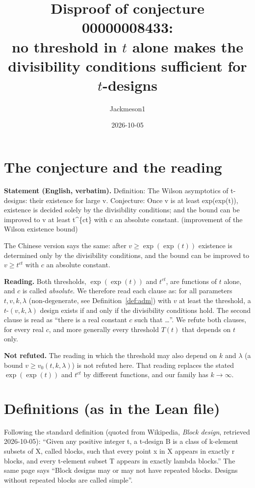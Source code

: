 \documentclass[11pt]{article}
\title{Disproof of conjecture 00000008433:\\ no threshold in $t$ alone makes the divisibility conditions sufficient for $t$-designs}
\author{Jackmeson1}
\date{2026-10-05}
\theoremstyle{definition}
\begin{document}
\maketitle

\section{The conjecture and the reading}

\textbf{Statement (English, verbatim).} Definition: The Wilson asymptotics of t-designs: their
existence for large v. Conjecture: Once v is at least exp(exp(t)), existence is decided solely by
the divisibility conditions; and the bound can be improved to v at least t\^{}\{ct\} with c an
absolute constant. (improvement of the Wilson existence bound)

The Chinese version says the same: after $v\ge \exp(\exp(t))$ existence is determined only by the
divisibility conditions, and the bound can be improved to $v\ge t^{ct}$ with $c$ an absolute
constant.

\textbf{Reading.} Both thresholds, $\exp(\exp(t))$ and $t^{ct}$, are functions of $t$ alone, and
$c$ is called \emph{absolute}. We therefore read each clause as: for all parameters
$t,v,k,\lambda$ (non-degenerate, see Definition~\ref{def:adm}) with $v$ at least the threshold, a
$t$-$(v,k,\lambda)$ design exists if and only if the divisibility conditions hold. The second clause
is read as ``there is a real constant $c$ such that \dots''. We refute both clauses, for every real
$c$, and more generally every threshold $T(t)$ that depends on $t$ only.

\textbf{Not refuted.} The reading in which the threshold may also depend on $k$ and $\lambda$
(a bound $v\ge v_0(t,k,\lambda)$) is not refuted here. That reading replaces the stated
$\exp(\exp(t))$ and $t^{ct}$ by different functions, and our family has $k\to\infty$.

\section{Definitions (as in the Lean file)}

Following the standard definition (quoted from Wikipedia, \emph{Block design}, retrieved
2026-10-05): ``Given any positive integer t, a t-design B is a class of k-element subsets of X,
called blocks, such that every point x in X appears in exactly r blocks, and every t-element subset
T appears in exactly lambda blocks.'' The same page says ``Block designs may or may not have
repeated blocks. Designs without repeated blocks are called simple''.
\end{document}
